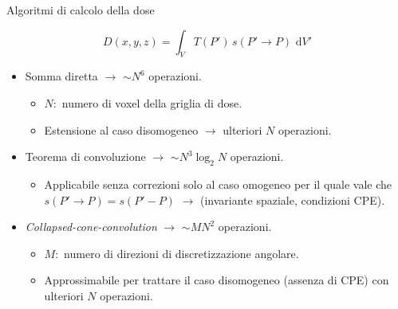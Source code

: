 \documentclass{beamer}
\newcommand{\de}{\,\textrm{d}}
\begin{document}
\begin{frame}{Algoritmi di calcolo della dose}

\small \begin{equation*}
D(x,y,z) = \int_V T(P')\,s(P'\rightarrow P)\, \de V'
\label{eq:conv}
\end{equation*}

\vspace{.5cm}
\begin{itemize}
\small
\item Somma diretta $\rightarrow$ $\sim N^6$ operazioni.
\begin{itemize}
\scriptsize
\item $N:$ numero di voxel della griglia di dose.
\item Estensione al caso disomogeneo $\rightarrow$ ulteriori $N$ operazioni.
\end{itemize}
\item Teorema di convoluzione $\rightarrow$ $\sim N^3\log_2 N$ operazioni.
\begin{itemize}
\scriptsize
\item Applicabile senza correzioni solo al caso omogeneo per il quale vale che $s(P'\rightarrow P) = s(P'- P)$ $\rightarrow$ (invariante spaziale, condizioni CPE).
\end{itemize}
\item \textit{Collapsed-cone-convolution} $\rightarrow$ $\sim MN^2$ operazioni.
\begin{itemize}
 \scriptsize 
\item $M:$ numero di direzioni di discretizzazione angolare.
\item Approssimabile per trattare il caso disomogeneo (assenza di CPE) con ulteriori $N$ operazioni.
\end{itemize}
\end{itemize}
\end{frame}
\end{document}
